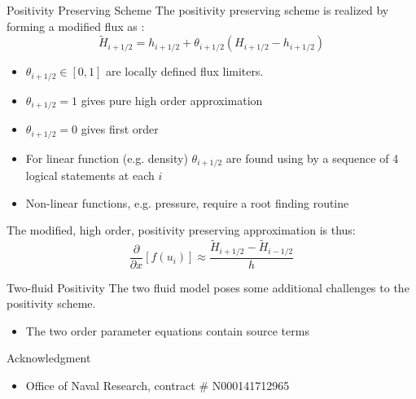 \documentclass[9pt]{beamer}
\begin{document}
\begin{frame}{Positivity Preserving Scheme}
  The positivity preserving scheme is realized by forming a modified flux as \cite{Positivity2013,Positivity2014}: 
  $$\tilde{H}_{i+1/2}=h_{i+1/2} + \theta_{i+1/2}(H_{i+1/2} - h_{i+1/2})$$
  
  \begin{itemize}
    \item $\theta_{i+1/2} \in [0,1]$ are locally defined flux limiters.
    \item $\theta_{i+1/2} =1$ gives pure high order approximation
    \item $\theta_{i+1/2} =0$ gives first order
    \item For linear function (e.g. density) $\theta_{i+1/2}$ are found using by a sequence of 4 logical statements at each $i$ 
    \item Non-linear functions, e.g. pressure, require a root finding routine
  \end{itemize}

  The modified, high order, positivity preserving approximation is thus:
  $$
  \frac{\partial}{\partial x}[f(u_i)] \approx \frac{\tilde{H}_{i+1 /2} - \tilde{H}_{i-1/2}}{h}
  $$
\end{frame}

\begin{frame}{Two-fluid Positivity}
  The two fluid model poses some additional challenges to the positivity scheme.
  \begin{itemize}
    \item The two order parameter equations contain source terms
  \end{itemize}
\end{frame}

\begin{frame}{Acknowledgment}
  \begin{itemize}
  \item
    Office of Naval Research, contract $\#$ N000141712965
  \end{itemize}  
  
\end{frame}  
\end{document}
